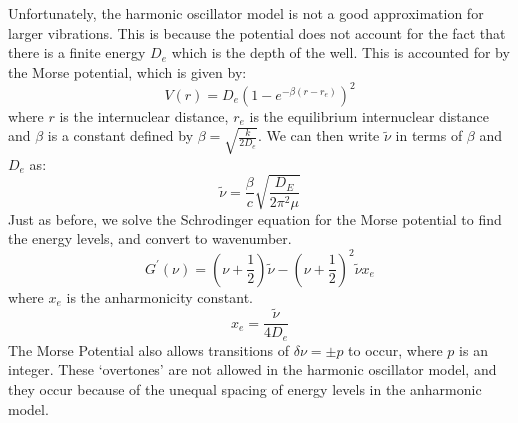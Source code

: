 \documentclass{article}
\begin{document}
Unfortunately, the harmonic oscillator model is not a good approximation for larger vibrations. This is because the potential does not account for the fact that there is a finite energy $D_e$ which is the depth of the well. This is accounted for by the Morse potential\cite{doi:10.1080/00268976.2024.2360542}, which is given by:
\begin{equation}
    V(r) = D_e\left(1-e^{-\beta(r-r_e)}\right)^2
\end{equation}
where $r$ is the internuclear distance, $r_e$ is the equilibrium internuclear distance and $\beta$ is a constant defined by $\beta = \sqrt{\frac{k}{2D_e}}$. We can then write $\tilde{\nu}$ in terms of $\beta$ and $D_e$ as:
\begin{equation}
    \tilde{\nu} = \frac{\beta}{c}\sqrt{\frac{D_E}{2\pi^2 \mu}}
\end{equation}
Just as before, we solve the Schrodinger equation for the Morse potential\cite{1988JChPh..88.4535D} to find the energy levels, and convert to wavenumber.
\begin{equation}
    G^{\prime}(\nu) = \left(\nu + \frac{1}{2}\right)\tilde{\nu} - \left(\nu + \frac{1}{2}\right)^2\tilde{\nu}x_e 
\end{equation}
where $x_e$ is the anharmonicity constant.\\
\begin{equation}
    x_e = \frac{\tilde{\nu}}{4D_e}
\end{equation}
\indent The Morse Potential also allows transitions of $\delta\nu = \pm p$ to occur, where $p$ is an integer. These `overtones' are not allowed in the harmonic oscillator model\cite{21316}, and they occur because of the unequal spacing of energy levels in the anharmonic model.\\
\end{document}
